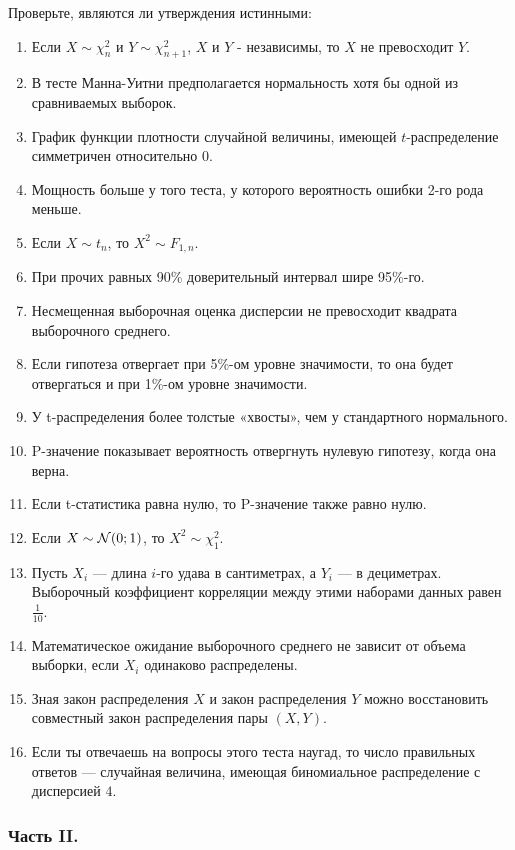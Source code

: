 Проверьте, являются ли утверждения истинными:

\begin{enumerate}
\item Если $X\sim \chi_{n}^{2}$ и $Y\sim \chi_{n+1}^{2}$, $X$ и $Y$ -
независимы, то  $X$ не превосходит $Y$.
\item В тесте Манна-Уитни предполагается нормальность хотя бы одной
из сравниваемых выборок.
\item График функции плотности случайной величины, имеющей
$t$-распределение симметричен относительно 0.
\item Мощность больше у того теста, у которого вероятность ошибки
2-го рода меньше.
\item Если $X\sim t_{n}$, то $X^{2}\sim F_{1,n}$.
\item При прочих равных 90\% доверительный интервал шире 95\%-го.
\item Несмещенная выборочная оценка дисперсии не превосходит квадрата
выборочного среднего.
\item Если гипотеза отвергает при 5\%-ом уровне значимости, то она
будет отвергаться и при 1\%-ом уровне значимости.
\item У t-распределения более толстые «хвосты», чем у стандартного
нормального.
\item P-значение показывает вероятность отвергнуть нулевую гипотезу,
когда она верна.
\item Если t-статистика равна нулю, то P-значение также равно нулю.
\item Если $X\sim \mathcal{N}(0;1)$, то $X^{2}\sim \chi_{1}^{2}$.
\item Пусть $X_{i}$ — длина $i$-го удава в сантиметрах, а $Y_{i}$ —
в дециметрах. Выборочный коэффициент корреляции между этими
наборами данных равен $\frac{1}{10}$.
\item Математическое ожидание выборочного среднего не зависит от
объема выборки, если $X_{i}$ одинаково распределены.
\item Зная закон распределения $X$ и закон распределения $Y$
можно восстановить совместный закон распределения пары $(X,Y)$.
\item Если ты отвечаешь на вопросы этого теста наугад, то число
правильных ответов — случайная величина, имеющая биномиальное
распределение с дисперсией $4$.
\end{enumerate}



\subsubsection*{Часть II.}

